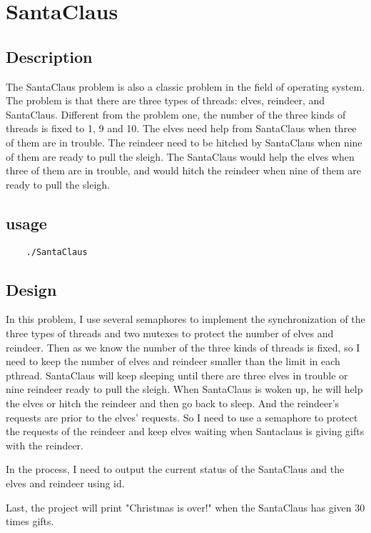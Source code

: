 \documentclass[a4paper]{article}
\begin{document}
\section{SantaClaus}

\subsection{Description}

The SantaClaus problem is also a classic problem in the field of operating system. 
The problem is that there are three types of threads: elves, reindeer, and SantaClaus. 
Different from the problem one, the number of the three kinds of threads is fixed to 1, 9 and 10.
The elves need help from SantaClaus when three of them are in trouble. 
The reindeer need to be hitched by SantaClaus when nine of them are ready to pull the sleigh. 
The SantaClaus would help the elves when three of them are in trouble, and would hitch the reindeer when nine of them are ready to pull the sleigh.

\subsection{usage}

\begin{lstlisting}
    ./SantaClaus
\end{lstlisting}

\subsection{Design}
In this problem, I use several semaphores to implement the synchronization of the three types of threads and two mutexes to protect the number of elves and reindeer.
Then as we know the number of the three kinds of threads is fixed, so I need to keep the number of elves and reindeer smaller than the limit in each pthread.
SantaClaus will keep sleeping until there are three elves in trouble or nine reindeer ready to pull the sleigh.
When SantaClaus is woken up, he will help the elves or hitch the reindeer and then go back to sleep.
And the reindeer's requests are prior to the elves' requests. So I need to use a semaphore to protect the requests of the reindeer and keep elves waiting when Santaclaus is giving gifts with the reindeer.

In the process, I need to output the current status of the SantaClaus and the elves and reindeer using id.

Last, the project will print "Christmas is over!" when the SantaClaus has given 30 times gifts.
\end{document}
